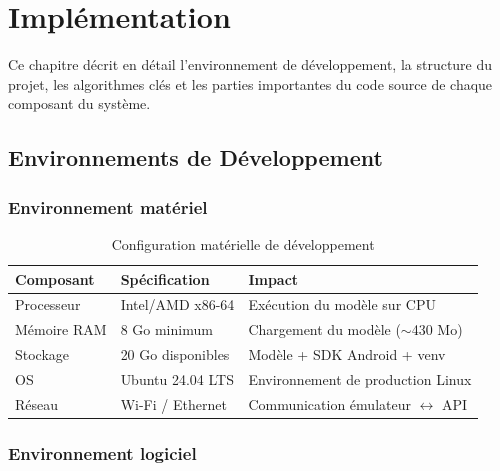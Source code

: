 \chapter{Implémentation}

\begin{infobox}
Ce chapitre décrit en détail l'environnement de développement, la structure
du projet, les algorithmes clés et les parties importantes du code source
de chaque composant du système.
\end{infobox}

\section{Environnements de Développement}

\subsection{Environnement matériel}

\begin{table}[H]
\centering
\caption{Configuration matérielle de développement}
\label{tab:hardware}
\renewcommand{\arraystretch}{1.4}
\begin{tabular}{lll}
\toprule
\rowcolor{bleuprincipal!15}
\textbf{Composant} & \textbf{Spécification} & \textbf{Impact} \\
\midrule
Processeur & Intel/AMD x86-64 & Exécution du modèle sur CPU \\
\rowcolor{gray!8}
Mémoire RAM & 8 Go minimum & Chargement du modèle ($\sim$430 Mo) \\
Stockage & 20 Go disponibles & Modèle + SDK Android + venv \\
\rowcolor{gray!8}
OS & Ubuntu 24.04 LTS & Environnement de production Linux \\
Réseau & Wi-Fi / Ethernet & Communication émulateur $\leftrightarrow$ API \\
\bottomrule
\end{tabular}
\end{table}

\subsection{Environnement logiciel}

